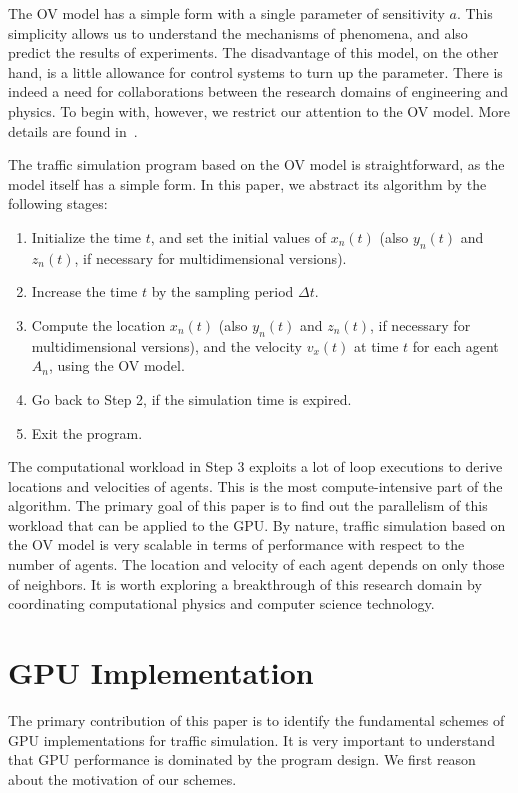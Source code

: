 \documentclass[times, 10pt, twocolumn]{article}
\begin{document}
The OV model has a simple form with a single parameter of sensitivity
$a$.
This simplicity allows us to understand the mechanisms of phenomena, and
also predict the results of experiments.
The disadvantage of this model, on the other hand, is a little allowance
for control systems to turn up the parameter.
There is indeed a need for collaborations between the research domains
of engineering and physics.
To begin with, however, we restrict our attention to the OV model.
More details are found in~\cite{Bando1995, Bando1995_2}.

The traffic simulation program based on the OV model is straightforward,
as the model itself has a simple form.
In this paper, we abstract its algorithm by the following stages:

\begin{enumerate}
 \item Initialize the time $t$, and set the initial values of $x_n(t)$
       (also $y_n(t)$ and $z_n(t)$, if necessary for multidimensional
       versions).
 \item Increase the time $t$ by the sampling period $\Delta t$.
 \item Compute the location $x_n(t)$ (also $y_n(t)$ and $z_n(t)$, if
       necessary for multidimensional versions), and the velocity
       $v_x(t)$ at time $t$ for each agent $A_n$, using the OV model.
 \item Go back to Step 2, if the simulation time is expired.
 \item Exit the program.
\end{enumerate}

The computational workload in Step 3 exploits a lot of loop executions
to derive locations and velocities of agents.
This is the most compute-intensive part of the algorithm.
The primary goal of this paper is to find out the parallelism of this
workload that can be applied to the GPU.
By nature, traffic simulation based on the OV model is very scalable in
terms of performance with respect to the number of agents.
The location and velocity of each agent depends on only those of
neighbors.
It is worth exploring a breakthrough of this research domain by
coordinating computational physics and computer science technology.

\section{GPU Implementation}
\label{sec:gpu_implementations}

The primary contribution of this paper is to identify the fundamental
schemes of GPU implementations for traffic simulation.
It is very important to understand that GPU performance is dominated by
the program design.
We first reason about the motivation of our schemes.
\end{document}
